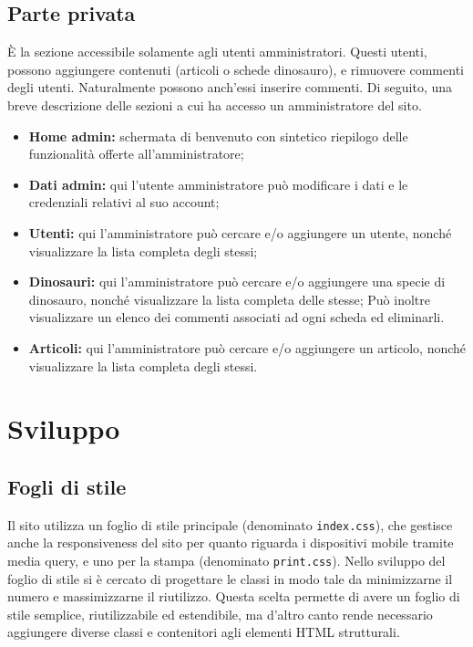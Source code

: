 \documentclass[12pt]{article}
\newcommand{\code}[1]{\texttt{#1}}
\begin{document}
	\subsection{Parte privata}

	È la sezione accessibile solamente agli utenti amministratori. Questi utenti, possono aggiungere contenuti (articoli o schede dinosauro), e rimuovere commenti degli utenti. Naturalmente possono anch'essi inserire commenti.
	Di seguito, una breve descrizione delle sezioni a cui ha accesso un amministratore del sito.
	
	\begin{itemize}
		\item \textbf{Home admin:} schermata di benvenuto con sintetico riepilogo delle funzionalità offerte all'amministratore;
		
		\item \textbf{Dati admin:} qui l'utente amministratore può modificare i dati e le credenziali relativi al suo account;
		
		\item \textbf{Utenti:} qui l'amministratore può cercare e/o aggiungere un utente, nonché visualizzare la lista completa degli stessi;
		
		\item \textbf{Dinosauri:} qui l'amministratore può cercare e/o aggiungere una specie di dinosauro, nonché visualizzare la lista completa delle stesse; Può inoltre visualizzare un elenco dei commenti associati ad ogni scheda ed eliminarli.
		
		\item \textbf{Articoli:} qui l'amministratore può cercare e/o aggiungere un articolo, nonché visualizzare la lista completa degli stessi.
	\end{itemize}
	
	\section{Sviluppo}
	
	\subsection{Fogli di stile}
	
	Il sito utilizza un foglio di stile principale (denominato \code{index.css}), che gestisce anche la responsiveness del sito per quanto riguarda i dispositivi mobile tramite media query, e uno per la stampa (denominato \code{print.css}). Nello sviluppo del foglio di stile si è cercato di progettare le classi in modo tale da minimizzarne il numero e massimizzarne il riutilizzo. Questa scelta permette di avere un foglio di stile semplice, riutilizzabile ed estendibile, ma d'altro canto rende necessario aggiungere diverse classi e contenitori agli elementi HTML strutturali.
	
\end{document}
